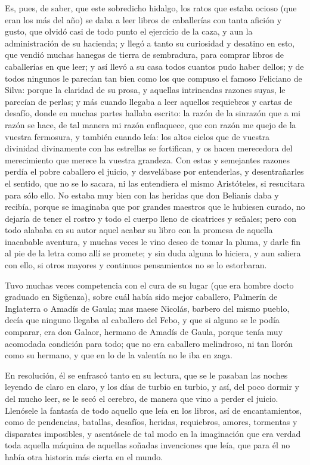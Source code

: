 \documentclass[12pt,
               twocolumn
              ]{article}
\begin{document}
Es, pues, de saber, que este sobredicho hidalgo, los ratos que estaba
ocioso (que eran los más del año) se daba a leer libros de caballerías
con tanta afición y gusto, que olvidó casi de todo punto el ejercicio
de la caza, y aun la administración de su hacienda; y llegó a tanto su
curiosidad y desatino en esto, que vendió muchas hanegas de tierra de
sembradura, para comprar libros de caballerías en que leer; y así
llevó a su casa todos cuantos pudo haber dellos; y de todos ningunos
le parecían tan bien como los que compuso el famoso Feliciano de
Silva: porque la claridad de su prosa, y aquellas intrincadas razones
suyas, le parecían de perlas; y más cuando llegaba a leer aquellos
requiebros y cartas de desafío, donde en muchas partes hallaba
escrito: la razón de la sinrazón que a mi razón se hace, de tal manera
mi razón enflaquece, que con razón me quejo de la vuestra fermosura, y
también cuando leía: los altos cielos que de vuestra divinidad
divinamente con las estrellas se fortifican, y os hacen merecedora del
merecimiento que merece la vuestra grandeza. Con estas y semejantes
razones perdía el pobre caballero el juicio, y desvelábase por
entenderlas, y desentrañarles el sentido, que no se lo sacara, ni las
entendiera el mismo Aristóteles, si resucitara para sólo ello. No
estaba muy bien con las heridas que don Belianis daba y recibía,
porque se imaginaba que por grandes maestros que le hubiesen curado,
no dejaría de tener el rostro y todo el cuerpo lleno de cicatrices y
señales; pero con todo alababa en su autor aquel acabar su libro con
la promesa de aquella inacabable aventura, y muchas veces le vino
deseo de tomar la pluma, y darle fin al pie de la letra como allí se
promete; y sin duda alguna lo hiciera, y aun saliera con ello, si
otros mayores y continuos pensamientos no se lo estorbaran.

Tuvo muchas veces competencia con el cura de su lugar (que era hombre
docto graduado en Sigüenza), sobre cuál había sido mejor caballero,
Palmerín de Inglaterra o Amadís de Gaula; mas maese Nicolás, barbero
del mismo pueblo, decía que ninguno llegaba al caballero del Febo, y
que si alguno se le podía comparar, era don Galaor, hermano de Amadís
de Gaula, porque tenía muy acomodada condición para todo; que no era
caballero melindroso, ni tan llorón como su hermano, y que en lo de la
valentía no le iba en zaga.

En resolución, él se enfrascó tanto en su lectura, que se le pasaban
las noches leyendo de claro en claro, y los días de turbio en turbio,
y así, del poco dormir y del mucho leer, se le secó el cerebro, de
manera que vino a perder el juicio. Llenósele la fantasía de todo
aquello que leía en los libros, así de encantamientos, como de
pendencias, batallas, desafíos, heridas, requiebros, amores, tormentas
y disparates imposibles, y asentósele de tal modo en la imaginación
que era verdad toda aquella máquina de aquellas soñadas invenciones
que leía, que para él no había otra historia más cierta en el mundo.
\end{document}
